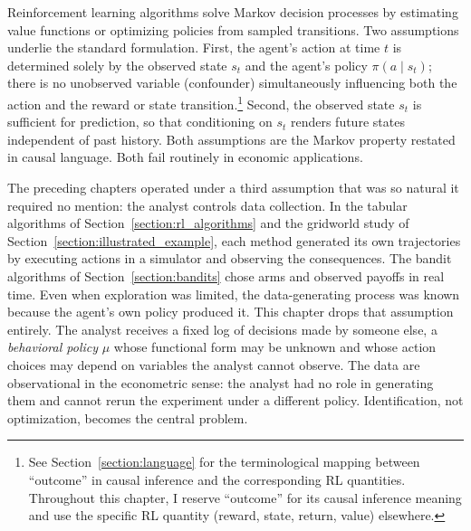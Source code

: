 %

Reinforcement learning algorithms solve Markov decision processes by estimating value functions or optimizing policies from sampled transitions. Two assumptions underlie the standard formulation. First, the agent's action at time $t$ is determined solely by the observed state $s_t$ and the agent's policy $\pi(a \mid s_t)$; there is no unobserved variable (confounder) simultaneously influencing both the action and the reward or state transition.\footnote{See Section~\ref{section:language} for the terminological mapping between ``outcome'' in causal inference and the corresponding RL quantities. Throughout this chapter, I reserve ``outcome'' for its causal inference meaning and use the specific RL quantity (reward, state, return, value) elsewhere.}
Second, the observed state $s_t$ is sufficient for prediction, so that conditioning on $s_t$ renders future states independent of past history. Both assumptions are the Markov property restated in causal language. Both fail routinely in economic applications.

The preceding chapters operated under a third assumption that was so natural it required no mention: the analyst controls data collection. In the tabular algorithms of Section~\ref{section:rl_algorithms} and the gridworld study of Section~\ref{section:illustrated_example}, each method generated its own trajectories by executing actions in a simulator and observing the consequences. The bandit algorithms of Section~\ref{section:bandits} chose arms and observed payoffs in real time. Even when exploration was limited, the data-generating process was known because the agent's own policy produced it. This chapter drops that assumption entirely. The analyst receives a fixed log of decisions made by someone else, a \textit{behavioral policy} $\mu$ whose functional form may be unknown and whose action choices may depend on variables the analyst cannot observe. The data are observational in the econometric sense: the analyst had no role in generating them and cannot rerun the experiment under a different policy. Identification, not optimization, becomes the central problem.

